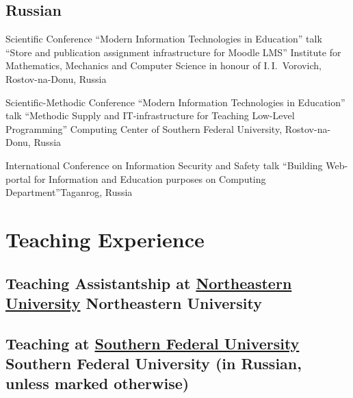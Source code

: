 \documentclass[11pt,a4paper]{moderncv}   %
\newcommand{\MyHrefImpl}[2]{%
\textcolor{blue}{\href{#1}{#2}}}
\def\LINKS{}
\newcommand*{\myhref}[2]{%
\ignorespaces%
\ifdefined\LINKS%
\MyHrefImpl{#1}{#2}%
\else%
#2%
\fi%
}
\begin{document}
{\footnotesize
\subsection{Russian}

%
    {Scientific Conference “Modern Information Technologies in Education”}%
    {talk “Store and publication assignment infrastructure for Moodle LMS”}
    {Institute for Mathematics, Mechanics and Computer Science in honour of I.\,I.~Vorovich, Rostov-na-Donu, Russia}{}%
    {%
    }

%
    {Scientific-Methodic Conference “Modern Information Technologies in Education”}%
    {talk “Methodic Supply and IT-infrastructure for Teaching Low-Level Programming”}%
    {Computing Center of Southern Federal University, Rostov-na-Donu, Russia}{}%
    {%
    }

%
    {International Conference on Information Security and Safety}%
    {talk “Building Web-portal for Information and Education purposes on Computing Department”}{Taganrog, Russia}{}%
    {
    }
}

\section{Teaching Experience}

\subsection{Teaching Assistantship at \myhref{http://sfedu.ru/international/}{Northeastern University}}


\subsection{Teaching at \myhref{http://sfedu.ru/international/}{Southern Federal University} (in Russian, unless marked otherwise)}
\end{document}
